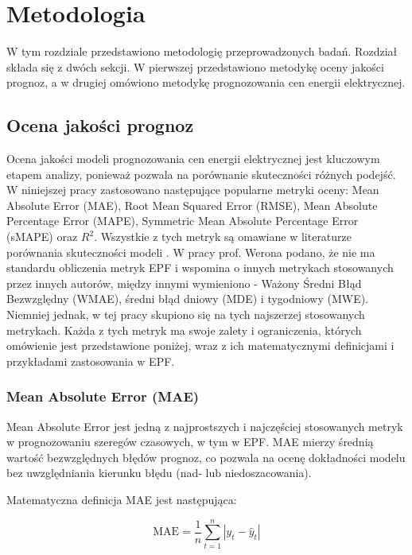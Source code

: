 \chapter{Metodologia}
\label{ch:metodologia}

W tym rozdziale przedstawiono metodologię przeprowadzonych badań. Rozdział składa się z dwóch sekcji. W pierwszej przedstawiono metodykę oceny jakości prognoz, a w drugiej omówiono metodykę prognozowania cen energii elektrycznej.

\section{Ocena jakości prognoz}
\label{sec:ocena_jakosci_prognoz}

Ocena jakości modeli prognozowania cen energii elektrycznej jest kluczowym etapem analizy, ponieważ pozwala na porównanie skuteczności różnych podejść. W niniejszej pracy zastosowano następujące popularne metryki oceny: Mean Absolute Error (MAE), Root Mean Squared Error (RMSE), Mean Absolute Percentage Error (MAPE), Symmetric Mean Absolute Percentage Error (sMAPE) oraz \( R^2 \). Wszystkie z tych metryk są omawiane w literaturze porównania skuteczności modeli \cite{en17225797}. W pracy prof. Werona \cite{WERON20141030} podano, że nie ma standardu obliczenia metryk EPF i wspomina o innych metrykach stosowanych przez innych autorów, między innymi wymieniono - Ważony Średni Błąd Bezwzględny (WMAE), średni błąd dniowy (MDE) i tygodniowy (MWE). Niemniej jednak, w tej pracy skupiono się na tych najszerzej stosowanych metrykach. Każda z tych metryk ma swoje zalety i ograniczenia, których omówienie jest przedstawione poniżej, wraz z ich matematycznymi definicjami i przykładami zastosowania w EPF.

\subsection{Mean Absolute Error (MAE)}
\label{subsec:mae}

Mean Absolute Error jest jedną z najprostszych i najczęściej stosowanych metryk w prognozowaniu szeregów czasowych, w tym w EPF. MAE mierzy średnią wartość bezwzględnych błędów prognoz, co pozwala na ocenę dokładności modelu bez uwzględniania kierunku błędu (nad- lub niedoszacowania).

Matematyczna definicja MAE jest następująca:

\[
\text{MAE} = \frac{1}{n} \sum_{t=1}^{n} \left| y_t - \hat{y}_t \right|
\]

